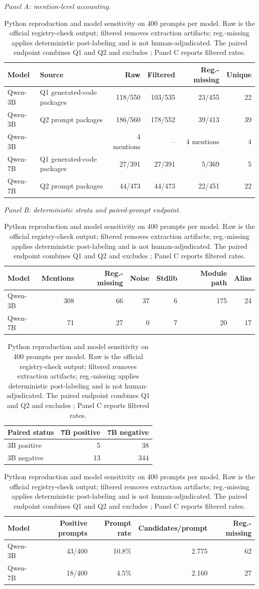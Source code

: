 \documentclass[pdflatex,sn-basic]{sn-jnl}
\newcommand{\codeid}[1]{\texttt{\detokenize{#1}}}
\newcommand{\rate}[2]{#1/#2}
\begin{document}
\begin{table}[htbp]
\caption{Python reproduction and model sensitivity on 400 prompts per model. Raw is the official registry-check output; filtered removes extraction artifacts; reg.-missing applies deterministic post-labeling and is not human-adjudicated. The paired endpoint combines Q1 and Q2 and excludes \codeid{pip}; Panel C reports filtered rates.}
\label{tab:python-results}
\footnotesize
\setlength{\tabcolsep}{3pt}
\textit{Panel A: mention-level accounting.}\par\smallskip
\begin{tabular}{@{}llrrrr@{}}
\toprule
Model & Source & Raw & Filtered & Reg.-missing & Unique \\
\midrule
Qwen-3B & Q1 generated-code packages & \rate{118}{550} & \rate{103}{535} & \rate{23}{455} & 22 \\
Qwen-3B & Q2 prompt packages & \rate{186}{560} & \rate{178}{552} & \rate{39}{413} & 39 \\
Qwen-3B & \codeid{pip_hallucinated} & 4 mentions & -- & 4 mentions & 4 \\
Qwen-7B & Q1 generated-code packages & \rate{27}{391} & \rate{27}{391} & \rate{5}{369} & 5 \\
Qwen-7B & Q2 prompt packages & \rate{44}{473} & \rate{44}{473} & \rate{22}{451} & 22 \\
\bottomrule
\end{tabular}
\medskip

\textit{Panel B: deterministic strata and paired-prompt endpoint.}\par\smallskip
\begin{tabular}{@{}lrrrrrr@{}}
\toprule
Model & Mentions & Reg.-missing & Noise & Stdlib & Module path & Alias \\
\midrule
Qwen-3B & 308 & 66 & 37 & 6 & 175 & 24 \\
Qwen-7B & 71 & 27 & 0 & 7 & 20 & 17 \\
\bottomrule
\end{tabular}
\hfill
\begin{tabular}{@{}lrr@{}}
\toprule
Paired status & 7B positive & 7B negative \\
\midrule
3B positive & 5 & 38 \\
3B negative & 13 & 344 \\
\bottomrule
\end{tabular}
\medskip

\begin{tabular}{@{}lrrrr@{}}
\toprule
Model & Positive prompts & Prompt rate & Candidates/prompt & Reg.-missing \\
\midrule
Qwen-3B & 43/400 & 10.8\% & 2.775 & 62 \\
Qwen-7B & 18/400 & 4.5\% & 2.160 & 27 \\
\bottomrule
\end{tabular}
\medskip


\end{table}
\end{document}
